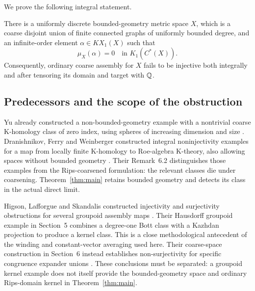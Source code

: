 We prove the following integral statement.

\begin{theorem}\label{thm:main}
There is a uniformly discrete bounded-geometry metric space $X$, which is a
coarse disjoint union of finite connected graphs of uniformly bounded degree,
and an infinite-order element $\alpha\in KX_1(X)$ such that
\[
 \mu_X(\alpha)=0\quad\text{in }K_1(C^*(X)).
\]
Consequently, ordinary coarse assembly for $X$ fails to be injective both
integrally and after tensoring its domain and target with $\mathbb Q$.
\end{theorem}

\subsection*{Predecessors and the scope of the obstruction}
Yu already constructed a non-bounded-geometry example with a nontrivial
coarse K-homology class of zero index, using spheres of increasing dimension
and size \cite[Section~8, Proposition~8.1]{Yu98}. Dranishnikov, Ferry and
Weinberger constructed integral noninjectivity examples for a map from
locally finite K-homology to Roe-algebra K-theory, also allowing spaces
without bounded geometry \cite[Introduction, pp.~920--921]{DFW}.
Their Remark~6.2 distinguishes those examples from the Rips-coarsened
formulation: the relevant classes die under coarsening. Theorem~\ref{thm:main}
retains bounded geometry and detects its class in the actual direct limit.

Higson, Lafforgue and Skandalis constructed injectivity and surjectivity
obstructions for several groupoid assembly maps \cite{HLS}. Their Hausdorff
groupoid example in Section~5 combines a degree-one Bott class with a
Kazhdan projection to produce a kernel class. This is a close methodological
antecedent of the winding and constant-vector averaging used here.
Their coarse-space construction in Section~6 instead establishes
non-surjectivity for specific congruence expander unions
\cite[Section~6, Proposition~11]{HLS}. These conclusions must be separated:
a groupoid kernel example does not itself provide the bounded-geometry
space and ordinary Rips-domain kernel in Theorem~\ref{thm:main}.

